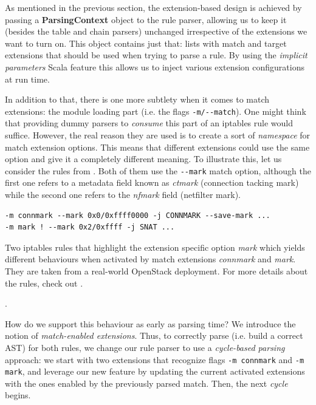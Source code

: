 As mentioned in the previous section, the extension-based design is achieved by
passing a \textbf{ParsingContext} object to the rule parser, allowing us to
keep it (besides the table and chain parsers) unchanged irrespective of the
extensions we want to turn on.  This object contains just that: lists with
match and target extensions that should be used when trying to parse a rule.
By using the \emph{implicit parameters} Scala feature this allows us to inject
various extension configurations at run time.

In addition to that, there is one more subtlety when it comes to match
extensions: the module loading part (i.e. the flags \lstinline{-m/--match}).
One might think that providing dummy parsers to \emph{consume} this part of an
iptables rule would suffice.  However, the real reason they are used is to
create a sort of \emph{namespace} for match extension options.  This means that
different extensions could use the same option and give it a completely
different meaning.  To illustrate this, let us consider the rules from
.  Both of them use the
\lstinline{--mark} match option, although the first one refers to a metadata
field known as \emph{ctmark} (connection tacking mark) while the second one
refers to the \emph{nfmark} field (netfilter mark).

\begin{listing}
  \lstset{numbers=none, frame=single, basicstyle=\ttfamily,
    xleftmargin=0.05\textwidth, xrightmargin=0.05\textwidth
  }
  \small
  \begin{lstlisting}
-m connmark --mark 0x0/0xffff0000 -j CONNMARK --save-mark ...
-m mark ! --mark 0x2/0xffff -j SNAT ...
  \end{lstlisting}
  \caption{Two iptables rules that highlight the extension specific option
  \emph{mark} which yields different behaviours when activated by match
  extensions \emph{connmark} and \emph{mark}.  They are taken from a real-world
  OpenStack deployment.  For more details about the rules, check out
  .}.
  \label{lst:namespace-example}
\end{listing}

How do we support this behaviour as early as parsing time?  We introduce the
notion of \emph{match-enabled extensions}.  Thus, to correctly parse (i.e.
build a correct AST) for both rules, we change our rule parser to use a
\emph{cycle-based parsing} approach: we start with two extensions that
recognize flags \lstinline{-m connmark} and \lstinline{-m mark}, and leverage
our new feature by updating the current activated extensions with the ones
enabled by the previously parsed match.  Then, the next \emph{cycle} begins.

